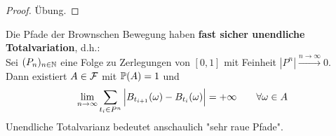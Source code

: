 \begin{proof}
	Übung. %
\end{proof}

\begin{theorem}\label{theorem10.5}
	Die Pfade der Brownschen Bewegung haben \textbf{fast sicher unendliche Totalvariation}, d.h.:\\
	Sei $(P_n)_{n\in\N}$ eine Folge zu Zerlegungen von $[0,1]$ mit Feinheit $|P^n|\overset{n\to\infty}{\longrightarrow}0$.\\
	Dann existiert $A\in\F$ mit $\P(A)=1$ und 
	\begin{align*}
		\limn\sum\limits_{t_i\in P^n}\Big|B_{t_{i+1}}(\omega)-B_{t_i}(\omega)\Big|=+\infty\qquad\forall\omega\in A
	\end{align*}
	Unendliche Totalvarianz bedeutet anschaulich "sehr raue Pfade".
\end{theorem}

